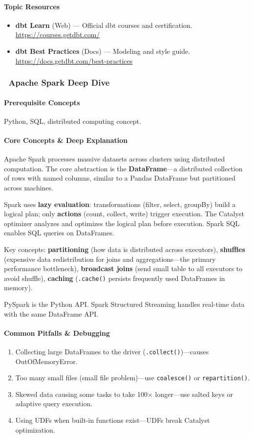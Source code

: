 \documentclass[11pt, a4paper, oneside]{report}
\newcommand{\mustmaster}[1]{\subsubsection{\texorpdfstring{\fcolorbox{blue!40!black}{blue!8}{\footnotesize\bfseries\color{blue!40!black} MUST MASTER}~#1}{#1}}}
\begin{document}
\paragraph{Topic Resources}
\begin{itemize}[leftmargin=*]
\item \textbf{dbt Learn} (Web) --- Official dbt courses and certification. \url{https://courses.getdbt.com/}
\item \textbf{dbt Best Practices} (Docs) --- Modeling and style guide. \url{https://docs.getdbt.com/best-practices}
\end{itemize}

\mustmaster{Apache Spark Deep Dive}

\paragraph{Prerequisite Concepts} Python, SQL, distributed computing concept.

\paragraph{Core Concepts \& Deep Explanation} Apache Spark processes massive datasets across clusters using distributed computation. The core abstraction is the \textbf{DataFrame}---a distributed collection of rows with named columns, similar to a Pandas DataFrame but partitioned across machines.

Spark uses \textbf{lazy evaluation}: transformations (filter, select, groupBy) build a logical plan; only \textbf{actions} (count, collect, write) trigger execution. The Catalyst optimizer analyzes and optimizes the logical plan before execution. Spark SQL enables SQL queries on DataFrames.

Key concepts: \textbf{partitioning} (how data is distributed across executors), \textbf{shuffles} (expensive data redistribution for joins and aggregations---the primary performance bottleneck), \textbf{broadcast joins} (send small table to all executors to avoid shuffle), \textbf{caching} (\texttt{.cache()} persists frequently used DataFrames in memory).

PySpark is the Python API. Spark Structured Streaming handles real-time data with the same DataFrame API.

\paragraph{Common Pitfalls \& Debugging}
\begin{enumerate}[leftmargin=*]
\item Collecting large DataFrames to the driver (\texttt{.collect()})---causes OutOfMemoryError.
\item Too many small files (small file problem)---use \texttt{coalesce()} or \texttt{repartition()}.
\item Skewed data causing some tasks to take 100$\times$ longer---use salted keys or adaptive query execution.
\item Using UDFs when built-in functions exist---UDFs break Catalyst optimization.
\end{enumerate}
\end{document}
